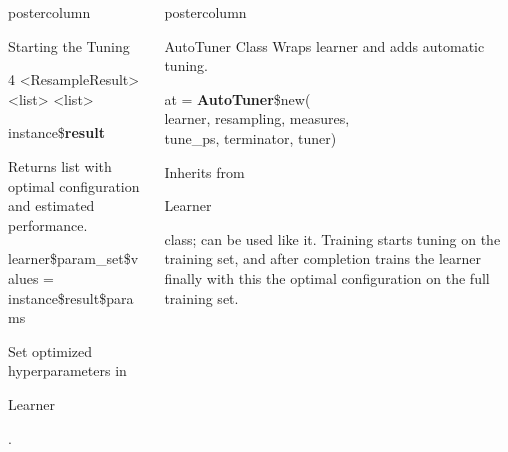 \documentclass{beamer}
\newlength{\columnheight} %
\newcommand{\codeinline}[1]{\begin{codeboxinline}#1\end{codeboxinline}}
\begin{document}
\begin{frame}[fragile]{}
\begin{columns}
\begin{column}{.245\textwidth}
\begin{beamercolorbox}[center]{postercolumn}
\begin{minipage}{.98\textwidth}
{\begin{myblock}{Starting the Tuning}
\begin{codeboxmultiline}[width=27cm]
{									\phantom{n}4 \space\space\space\space\space{} \space\space <ResampleResult> \space\space\space{} <list> <list> \space 0.2721586}
							\end{codeboxmultiline}
							\vspace{1em}
							\begin{codebox}
								instance\$\textbf{result}
							\end{codebox}
							Returns list with optimal configuration and estimated performance.
							\\
							\begin{codebox}
								{\footnotesize learner\$param\_set\$values = instance\$result\$params}
							\end{codebox}
							Set optimized hyperparameters in \codeinline{Learner}.
						\end{myblock}
						\vfill}
				\end{minipage}
			\end{beamercolorbox}
		\end{column}
		\begin{column}{.245\textwidth}
			\begin{beamercolorbox}[center]{postercolumn}
				\begin{minipage}{.98\textwidth}
					\parbox[t][\columnheight]{\textwidth}{
						\begin{myblock}{AutoTuner Class}
							Wraps learner and adds automatic tuning. 
							\\
							\begin{codeboxmultiline}[width=20cm]
								at = \textbf{AutoTuner}\$new(\\
								\hspace*{1ex}learner, resampling, measures, \\
								\hspace*{1ex}tune\_ps, terminator, tuner)
							\end{codeboxmultiline}
							\vspace{1em}
                            Inherits from \codeinline{Learner} class; can be used like it. Training starts tuning on the training set, and after completion trains the learner finally with this the optimal configuration on the full training set.

\end{myblock}}
\end{minipage}
\end{beamercolorbox}
\end{column}
\end{columns}
\end{frame}
\end{document}
